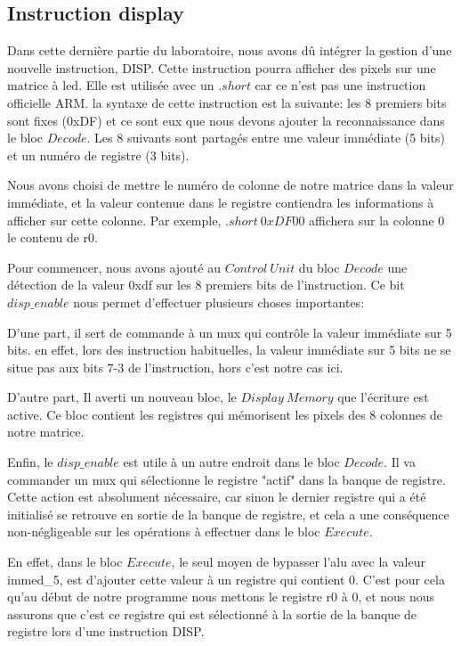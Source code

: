 \documentclass[11pt,a4paper]{article}
\begin{document}
\subsection{Instruction display}

Dans cette dernière partie du laboratoire, nous avons dû intégrer la gestion d'une nouvelle instruction, DISP. Cette instruction pourra afficher des pixels sur une matrice à led. Elle est utilisée avec un $.short$ car ce n'est pas une instruction officielle ARM. la syntaxe de cette instruction est la suivante: les 8 premiers bits sont fixes (0xDF) et ce sont eux que nous devons ajouter la reconnaissance dans le bloc $Decode$. Les 8 suivants sont partagés entre une valeur immédiate (5 bits) et un numéro de registre (3 bits).

Nous avons choisi de mettre le numéro de colonne de notre matrice dans la valeur immédiate, et la valeur contenue dans le registre contiendra les informations à afficher sur cette colonne. Par exemple, $.short\ 0xDF00$ affichera sur la colonne 0 le contenu de r0.

Pour commencer, nous avons ajouté au $Control\ Unit$ du bloc $Decode$ une détection de la valeur 0xdf sur les 8 premiers bits de l'instruction. Ce bit $disp\_enable$ nous permet d'effectuer plusieurs choses importantes:

D'une part, il sert de commande à un mux qui contrôle la valeur immédiate sur 5 bits. en effet, lors des instruction habituelles, la valeur immédiate sur 5 bits ne se situe pas aux bits 7-3 de l'instruction, hors c'est notre cas ici.

D'autre part, Il averti un nouveau bloc, le $Display\ Memory$ que l'écriture est active. Ce bloc contient les registres qui mémorisent les pixels des 8 colonnes de notre matrice.

Enfin, le $disp\_enable$ est utile à un autre endroit dans le bloc $Decode$. Il va commander un mux qui sélectionne le registre "actif" dans la banque de registre. Cette action est absolument nécessaire, car sinon le dernier registre qui a été initialisé se retrouve en sortie de la banque de registre, et cela a une conséquence non-négligeable sur les opérations à effectuer dans le bloc $Execute$.

En effet, dans le bloc $Execute$, le seul moyen de bypasser l'alu avec la valeur immed\_5, est d'ajouter cette valeur à un registre qui contient 0. C'est pour cela qu'au début de notre programme nous mettons le registre r0 à 0, et nous nous assurons que c'est ce registre qui est sélectionné à la sortie de la banque de registre lors d'une instruction DISP.
\end{document}

